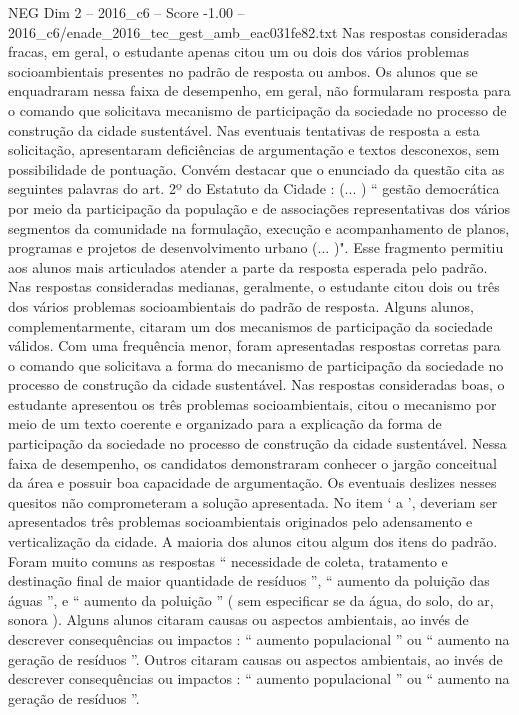 \begin{textsample}{NEG Dim 2 – 2016\_c6 – Score -1.00 – 2016\_c6/enade\_2016\_tec\_gest\_amb\_eac031fe82.txt}
Nas respostas consideradas fracas, em geral, o estudante apenas citou um ou dois dos vários problemas socioambientais presentes no padrão de resposta ou ambos.
Os alunos que se enquadraram nessa faixa de desempenho, em geral, não formularam resposta para o comando que solicitava mecanismo de participação da sociedade no processo de construção da cidade sustentável.
Nas eventuais tentativas de resposta a esta solicitação, apresentaram deficiências de argumentação e textos desconexos, sem possibilidade de pontuação.
Convém destacar que o enunciado da questão cita as seguintes palavras do art. 2º do Estatuto da Cidade : (... ) “ gestão democrática por meio da participação da população e de associações representativas dos vários segmentos da comunidade na formulação, execução e acompanhamento de planos, programas e projetos de desenvolvimento urbano (... )".
Esse fragmento permitiu aos alunos mais articulados atender a parte da resposta esperada pelo padrão.
Nas respostas consideradas medianas, geralmente, o estudante citou dois ou três dos vários problemas socioambientais do padrão de resposta.
Alguns alunos, complementarmente, citaram um dos mecanismos de participação da sociedade válidos.
Com uma frequência menor, foram apresentadas respostas corretas para o comando que solicitava a forma do mecanismo de participação da sociedade no processo de construção da cidade sustentável.
Nas respostas consideradas boas, o estudante apresentou os três problemas socioambientais, citou o mecanismo por meio de um texto coerente e organizado para a explicação da forma de participação da sociedade no processo de construção da cidade sustentável.
Nessa faixa de desempenho, os candidatos demonstraram conhecer o jargão conceitual da área e possuir boa capacidade de argumentação.
Os eventuais deslizes nesses quesitos não comprometeram a solução apresentada.
No item ‘ a ’, deveriam ser apresentados três problemas socioambientais originados pelo adensamento e verticalização da cidade.
A maioria dos alunos citou algum dos itens do padrão.
Foram muito comuns as respostas “ necessidade de coleta, tratamento e destinação final de maior quantidade de resíduos ”, “ aumento da poluição das águas ”, e “ aumento da poluição ” ( sem especificar se da água, do solo, do ar, sonora ).
Alguns alunos citaram causas ou aspectos ambientais, ao invés de descrever consequências ou impactos : “ aumento populacional ” ou “ aumento na geração de resíduos ”.
Outros citaram causas ou aspectos ambientais, ao invés de descrever consequências ou impactos : “ aumento populacional ” ou “ aumento na geração de resíduos ”.

\end{textsample}
